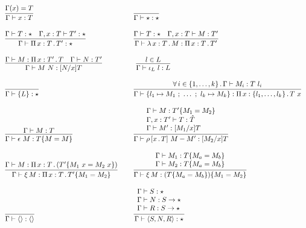 \documentclass{article}
\begin{document}
\begin{figure}
  \[
  \begin{array}{lllll}
    \infer{\Gamma \vdash x : T}{\Gamma(x) = T}
    &\ &
    \infer{\Gamma \vdash \star : \star}{\ }
    \\ \\
    \infer{\Gamma \vdash \Pia{x}{T}{T'} : \star}{\Gamma \vdash T : \star & \Gamma , x : T \vdash T' : \star}
    &\ &
    \infer{\Gamma \vdash \tlam{x}{T}{M} : \Pia{x}{T}{T'}}{\Gamma \vdash T : \star & \Gamma , x : T \vdash M : T'}
    \\ \\
    \infer{\Gamma \vdash M\ N : [N/x]T}{\Gamma \vdash M : \Pia{x}{T'}{T} & \Gamma  \vdash N : T'}
    &\ &\ 
    \infer{\Gamma \vdash \inj{L}{l} : L}{l \in L }
    \\ \\
    \infer{\Gamma\vdash \{ L \} : \star}{\ }
    &\ &
\infer{\Gamma\vdash \{ l_1 \mapsto M_1\ ;\ \ldots\ ;\ l_k\mapsto M_k \} : \Pia{x}{\{ l_1, \ldots, l_k \}}{T\ x}}
          {\all{i\in\{1,\ldots,k\}}{\Gamma \vdash M_i : T\ l_i}}
    \\ \\
    \infer{\Gamma \vdash \rfl{M} : \eqtm{M}{T}{M}}{\Gamma \vdash M : T}
    &\ &
    \infer{\Gamma \vdash \cng{x}{T}{M}{M'} : [M_2/x]T}
          {\begin{array}{l}\Gamma \vdash M : \eqtm{M_1}{T'}{M_2} \\ \Gamma , x : T' \vdash T : \hat{T} \\ \Gamma \vdash M' : [M_1/x]T
          \end{array}}
\\ \\
          \infer{\Gamma \vdash \ext{M} : \eqtm{M_1}{\Pia{x}{T}{T'}}{M_2}}{\Gamma \vdash M : \Pia{x}{T}{(\eqtm{M_1\ x}{T'}{M_2\ x})}}
    &\ &
          \infer{\Gamma \vdash \ext{M} : \eqtm{M_1}{(\eqtm{M_a}{T}{M_b})}{M_2}}
                {\begin{array}{l}\Gamma \vdash M_1 :\eqtm{M_a}{T}{M_b} \\ \Gamma \vdash M_2 : \eqtm{M_a}{T}{M_b} \end{array}}
\\ \\ 
          \infer{\Gamma\vdash \wunit : \wunit}{\ }
          &\ &
\infer{ \Gamma \vdash \w{S}{N}{R} : \star}{\begin{array}{l}\Gamma \vdash S : \star \\ \Gamma \vdash N : S \to \star \\ \Gamma \vdash R : S \to \star \end{array}}

\end{array}\]
\end{figure}
\end{document}
